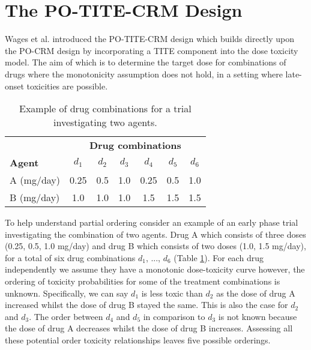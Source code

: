 \section{The PO-TITE-CRM Design}
\label{section2.2} %

Wages et al. \cite{wagesUsingTimetoeventContinual2013} introduced the PO-TITE-CRM design which builds directly upon the PO-CRM design by incorporating a TITE component into the dose toxicity model. The aim of which is to determine the target dose for combinations of drugs where the monotonicity assumption does not hold, in a setting where late-onset toxicities are possible.

\begin{table}[h!]
	\centering
	\caption[Example drug combinations with two agents.]{Example of drug combinations for a trial investigating two agents.}
	\label{tab_adept:ex_drug_combo}
	\begin{tabular}{lcccccc}
		\hline  & \multicolumn{6}{c}{\textbf{Drug combinations}}  \\
		\textbf{Agent} & $d_{1}$ & $d_{2}$ & $d_{3}$ & $d_{4}$ & $d_{5}$ & $d_{6}$ \\ \hline
		A (mg/day) & 0.25 & 0.5 & 1.0 & 0.25 & 0.5 & 1.0         \\
		B (mg/day) & 1.0  & 1.0 & 1.0 & 1.5  & 1.5 & 1.5         \\ \hline
	\end{tabular}
\end{table}

To help understand partial ordering consider an example of an early phase trial investigating the combination of two agents. Drug A which consists of three doses (0.25, 0.5, 1.0 mg/day) and drug B which consists of two doses (1.0, 1.5 mg/day), for a total of six drug combinations $d_{1}$, ..., $d_{6}$ (Table \ref{tab_adept:ex_drug_combo}). For each drug independently we assume they have a monotonic dose-toxicity curve however, the ordering of toxicity probabilities for some of the treatment combinations is unknown. Specifically, we can say $d_{1}$ is less toxic than $d_{2}$ as the dose of drug A increased whilst the dose of drug B stayed the same. This is also the case for $d_{2}$ and $d_{3}$. The order between $d_{4}$ and $d_{5}$ in comparison to $d_{3}$ is not known because the dose of drug A decreases whilst the dose of drug B increases. Assessing all these potential order toxicity relationships leaves five possible orderings. 

